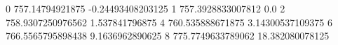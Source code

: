0 757.14794921875 -0.24493408203125
1 757.3928833007812 0.0
2 758.9307250976562 1.537841796875
4 760.535888671875 3.14300537109375
6 766.5565795898438 9.1636962890625
8 775.7749633789062 18.382080078125
